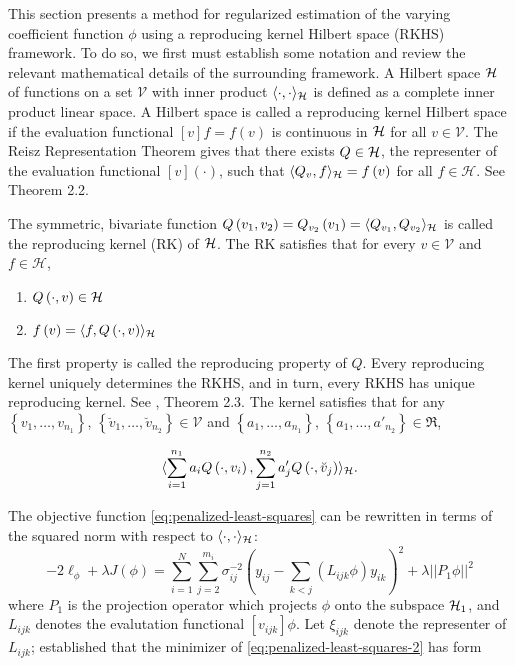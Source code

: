 This section presents a method for regularized estimation of the varying coefficient function $\phi$ using a reproducing kernel Hilbert space (RKHS) framework. To do so, we first must establish some notation and review the relevant mathematical details of the surrounding framework. A Hilbert space $\mathcal{H}$ of functions on a set $\mathcal{V}$ with inner product $\langle \cdot, \cdot\rangle_{\mathcal{H}}$ is defined as a complete inner product linear space. A Hilbert space is called a reproducing kernel Hilbert space if the evaluation functional $\left[v\right]f = f\left(v\right)$ is continuous in $\mathcal{H}$ for all $v \in \mathcal{V}$. The Reisz Representation Theorem gives that there exists $Q \in \mathcal{H}$, the representer of the evaluation functional $\left[v\right]\left(\cdot\right)$, such that $\langle Q_v, f \rangle_{\mathcal{H}} = f\left(v\right)$ for all $f \in \mathcal{H}$. See \citet{gu2013smoothing} Theorem 2.2.

\bigskip

The symmetric, bivariate function $Q\left(v_1, v_2 \right) = Q_{v_2 }\left(v_1\right) = \langle Q_{v_1}, Q_{v_2} \rangle_{\mathcal{H}}$ is called the reproducing kernel (RK) of $\mathcal{H}$. The RK satisfies that for every $v \in \mathcal{V}$ and $f \in \mathcal{H}$,

\begin{enumerate}
\item $Q\left(\cdot, v \right) \in \mathcal{H}$ 
\item $f\left(v\right) = \langle f, Q\left(\cdot, v\right)\rangle_{\mathcal{H}}$\label{rkhs-reproducing-property}
\end{enumerate}
\noindent
The first property is called the reproducing property of $Q$. Every reproducing kernel uniquely determines the RKHS, and in turn, every RKHS has unique reproducing kernel. See \citet{gu2013smoothing}, Theorem 2.3. The kernel satisfies that for any $\left\{v_1,\dots, v_{n_1}\right\}$, $\left\{\breve{v}_1,\dots, \breve{v}_{n_2}\right\} \in \mathcal{V}$ and $\left\{a_1,\dots, a_{n_1}\right\}$, $\left\{a_1,\dots, a'_{n_2}\right\} \in \Re$,

\begin{equation}
 \langle\sum_{i = 1}^{n_1} a_i Q\left(\cdot, v_i\right), \sum_{j = 1}^{n_2} a'_j Q\left(\cdot, \breve{v}_j\right) \rangle_{\mathcal{H}}.
\end{equation}

The objective function \ref{eq:penalized-least-squares} can be rewritten in terms of the squared norm with respect to $\langle\cdot,\cdot\rangle_{\mathcal{H}}$:
\begin{equation} \label{eq:penalized-least-squares-2}
-2\ell_\phi + \lambda J\left(\phi\right) = \sum_{i=1}^N \sum_{j=2}^{m_i} \sigma^{-2}_{ij}\left( y_{ij} - \sum_{k<j}\left( L_{ijk}\phi\right) y_{ik}  \right)^2 + \lambda \vert\vert P_1 \phi \vert \vert^2
\end{equation}
\noindent
where $P_1$ is the projection operator which projects $\phi$ onto the subspace $\mathcal{H}_1$, and $L_{ijk}$ denotes the evalutation functional $\left[v_{ijk}\right] \phi$. Let $\xi_{ijk}$ denote the representer of $L_{ijk}$; \citet{kimeldorf1971some} established that the minimizer of \ref{eq:penalized-least-squares-2} has form

